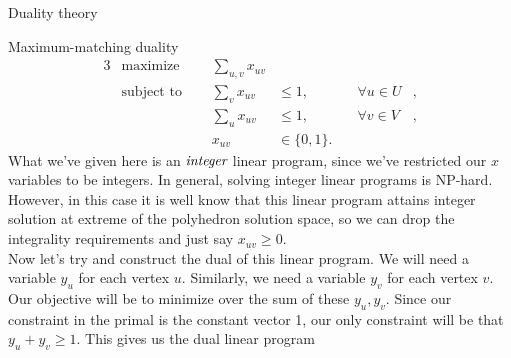 \documentclass[11pt]{article}
\renewcommand{\'}{^{'}}
\begin{document}
\begin{section}{Duality theory}
\begin{subsection}{Maximum-matching duality}
	\begin{alignat}{3}
		& \text{maximize } & \sum_{u,v} x_{uv}& \\
		& \text{subject to } \quad & \sum_{v} x_{uv} & \leq 1, & \quad \forall u\in U&, \\
				     &\quad & \sum_{u} x_{uv} & \leq 1, & \quad \forall v\in V &, \\
				&& x_{uv} & \in \{0,1\}.
	\end{alignat}
	What we've given here is an $\emph{integer}$ linear program, since we've restricted our 
	$x$ variables to be integers. In general, solving integer linear programs is NP-hard. However, 
	in this case it is well know that this linear program attains integer solution at extreme 
	of the polyhedron solution space, so we can drop the integrality requirements and just say 
	$x_{uv} \geq 0$.\\
	Now let's try and construct the dual of this linear program. We will need a variable 
	$y_u$ for each vertex $u$. Similarly, we need a variable $y_v$ for each vertex $v$. Our 
	objective will be to minimize over the sum of these $y_u,y_v$. Since our constraint 
	in the primal is the constant vector 1, our only constraint will be that $y_u + y_v \geq 1$. 
	This gives us the dual linear program


\end{subsection}
\end{section}
\end{document}
